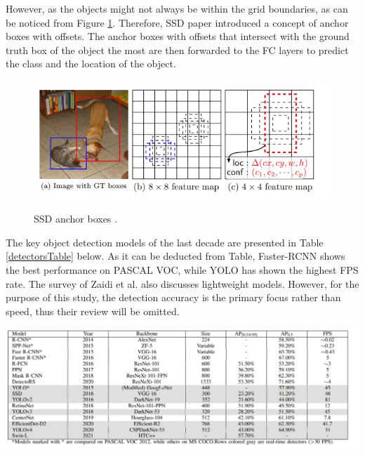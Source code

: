 However, as the objects might not always be within the grid boundaries, as can be noticed from Figure \ref{ssd_boxes}. Therefore, SSD paper introduced a concept of anchor boxes with offsets. The anchor boxes with offsets that intersect with the ground truth box of the object the most are then forwarded to the FC layers to predict the class and the location of the object. 

\begin{figure}[htb]
	\begin{center}
		\includegraphics[width=12cm]{./ssd_boxes.png}
	\end{center}
	\caption{SSD anchor boxes \cite{Liu2015}.}
	\begin{center}
		\label{ssd_boxes}
	\end{center}
\end{figure}
\FloatBarrier

The key object detection models of the last decade are presented in Table \ref{detectorsTable} below. As it can be deducted from Table, Faster-RCNN shows the best performance on PASCAL VOC, while YOLO has shown the highest FPS rate. The survey of Zaidi et al. \cite{Zaidi2021} also discusses lightweight models. However, for the purpose of this study, the detection accuracy is the primary focus rather than speed, thus their review will be omitted. 

\begin{table}[htb]
	\begin{center}
		\includegraphics[width=16cm]{./detectorsTable.png}
	\end{center}
	\begin{center}
		\label{detectorsTable}
	\end{center}
\end{table}

